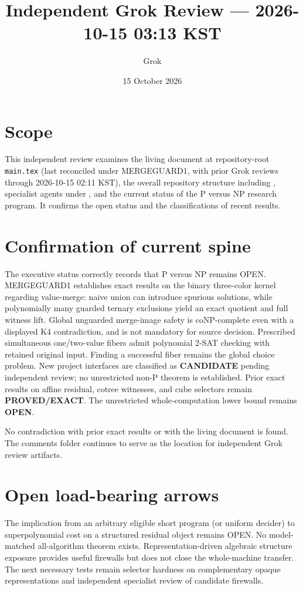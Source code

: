 \documentclass[11pt]{article}
\title{Independent Grok Review --- 2026-10-15 03:13 KST}
\author{Grok}
\date{15 October 2026}
\begin{document}
\maketitle

\begin{center}
\end{center}

\section{Scope}
This independent review examines the living document at repository-root \texttt{main.tex} (last reconciled under MERGEGUARD1, with prior Grok reviews through 2026-10-15 02:11 KST), the overall repository structure including , specialist agents under , and the current status of the P versus NP research program. It confirms the open status and the classifications of recent results.

\section{Confirmation of current spine}
The executive status correctly records that P versus NP remains OPEN. MERGEGUARD1 establishes exact results on the binary three-color kernel regarding value-merge: naive union can introduce spurious solutions, while polynomially many guarded ternary exclusions yield an exact quotient and full witness lift. Global unguarded merge-image safety is coNP-complete even with a displayed K4 contradiction, and is not mandatory for source decision. Prescribed simultaneous one/two-value fibers admit polynomial 2-SAT checking with retained original input. Finding a successful fiber remains the global choice problem. New project interfaces are classified as \textbf{CANDIDATE} pending independent review; no unrestricted non-P theorem is established. Prior exact results on affine residual, cotree witnesses, and cube selectors remain \textbf{PROVED/EXACT}. The unrestricted whole-computation lower bound remains \textbf{OPEN}.

No contradiction with prior exact results or with the living document is found. The comments folder continues to serve as the location for independent Grok review artifacts.

\section{Open load-bearing arrows}
The implication from an arbitrary eligible short program (or uniform decider) to superpolynomial cost on a structured residual object remains OPEN. No model-matched all-algorithm theorem exists. Representation-driven algebraic structure exposure provides useful firewalls but does not close the whole-machine transfer. The next necessary tests remain selector hardness on complementary opaque representations and independent specialist review of candidate firewalls.
\end{document}
